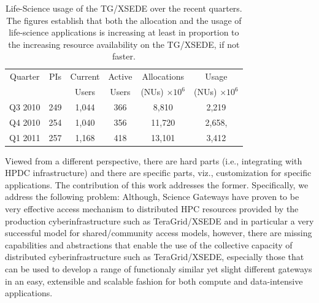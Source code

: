\documentclass[]{svjour3}
\begin{document}
\begin{table}
\centering
 \small
\begin{tabular}{|c|c|c|c|c|c|} 
  \hline  Quarter & PIs & Current & Active & Allocations  & Usage\\
  & & Users  &  Users & (NUs) $\times 10^6$& (NUs) $\times 10^6$ \\ \hline
  Q3 2010 & 249 & 1,044 & 366 & 8,810   & 2,219  \\ \hline
  Q4 2010 & 254 & 1,040 & 356 & 11,720  & 2,658, \\ \hline
  Q1 2011 & 257 & 1,168 & 418 & 13,101  & 3,412\\ \hline 
\end{tabular} 
\caption{Life-Science usage of the TG/XSEDE over the recent
  quarters. The figures establish that both the  allocation and the
  usage of life-science applications is increasing at least in
  proportion to the increasing resource availability on the TG/XSEDE,
  if not faster.}
 \label{tg2011} 
\end{table}





Viewed from a different perspective, there are hard parts (i.e.,
integrating with HPDC infrastructure) and there are specific parts,
viz., customization for specific applications.  The contribution of
this work addresses the former. Specifically, we address the following
problem: Although, Science Gateways have proven to be very effective
access mechanism to distributed HPC resources provided by the
production cyberinfrastructure such as TeraGrid/XSEDE and in
particular a very successful model for shared/community access models,
however, there are missing capabilities and abstractions that enable
the use of the collective capacity of distributed cyberinfrastructure
such as TeraGrid/XSEDE, especially those that can be used to develop a
range of functionaly similar yet slight different gateways in an easy,
extensible and scalable fashion for both compute and data-intensive
applications.
\end{document}
